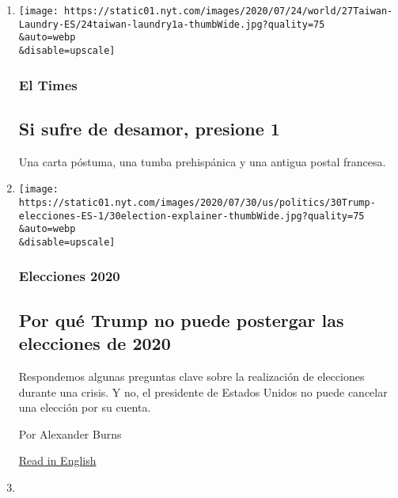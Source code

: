 \begin{enumerate}
\def\labelenumi{\arabic{enumi}.}
\item
  \href{/es/2020/07/31/espanol/elecciones-2020-trump-mexico-violencia.html}{}

  \texttt{[image: https://static01.nyt.com/images/2020/07/24/world/27Taiwan-Laundry-ES/24taiwan-laundry1a-thumbWide.jpg?quality=75\\\&auto=webp\\\&disable=upscale]}

  \hypertarget{el-times}{%
  \subsubsection{El Times}\label{el-times}}

  \hypertarget{si-sufre-de-desamor-presione-1}{%
  \subsection{Si sufre de desamor, presione
  1}\label{si-sufre-de-desamor-presione-1}}

  Una carta póstuma, una tumba prehispánica y una antigua postal
  francesa.
\item
  \href{/es/2020/07/30/espanol/estados-unidos/trump-retrasar-elecciones.html}{}

  \texttt{[image: https://static01.nyt.com/images/2020/07/30/us/politics/30Trump-elecciones-ES-1/30election-explainer-thumbWide.jpg?quality=75\\\&auto=webp\\\&disable=upscale]}

  \hypertarget{elecciones-2020}{%
  \subsubsection{Elecciones 2020}\label{elecciones-2020}}

  \hypertarget{por-quuxe9-trump-no-puede-postergar-las-elecciones-de-2020}{%
  \subsection{Por qué Trump no puede postergar las elecciones de
  2020}\label{por-quuxe9-trump-no-puede-postergar-las-elecciones-de-2020}}

  Respondemos algunas preguntas clave sobre la realización de elecciones
  durante una crisis. Y no, el presidente de Estados Unidos no puede
  cancelar una elección por su cuenta.

  Por Alexander Burns

  \href{https://www.nytimes.com/2020/07/30/us/politics/trump-postpone-election.html}{Read
  in English}
\item
  \href{/es/2020/07/29/espanol/estados-unidos/biden-vicepresidente.html}{}


\end{enumerate}
